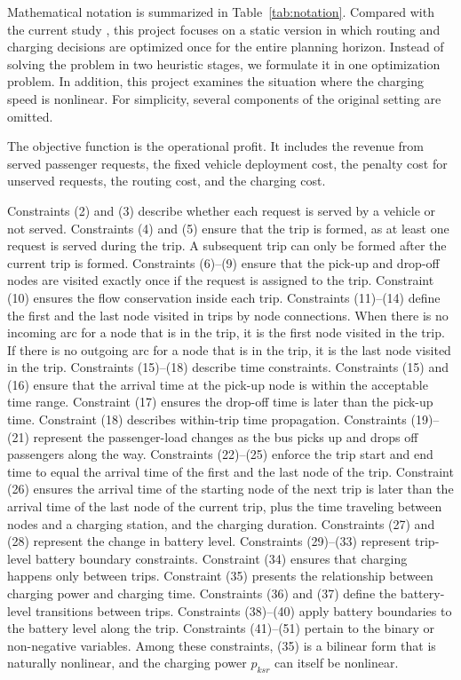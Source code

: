 \documentclass[11pt]{article}
\begin{document}
Mathematical notation is summarized in Table~\ref{tab:notation}. Compared with the current study \cite{jiang2026two}, this project focuses on a static version in which routing and charging decisions are optimized once for the entire planning horizon. Instead of solving the problem in two heuristic stages, we formulate it in one optimization problem. In addition, this project examines the situation where the charging speed is nonlinear. For simplicity, several components of the original setting are omitted.

The objective function is the operational profit. It includes the revenue from served passenger requests, the fixed vehicle deployment cost, the penalty cost for unserved requests, the routing cost, and the charging cost.

Constraints (2) and (3) describe whether each request is served by a vehicle or not served. Constraints (4) and (5) ensure that the trip is formed, as at least one request is served during the trip. A subsequent trip can only be formed after the current trip is formed. Constraints (6)--(9) ensure that the pick-up and drop-off nodes are visited exactly once if the request is assigned to the trip. Constraint (10) ensures the flow conservation inside each trip. Constraints (11)--(14) define the first and the last node visited in trips by node connections. When there is no incoming arc for a node that is in the trip, it is the first node visited in the trip. If there is no outgoing arc for a node that is in the trip, it is the last node visited in the trip. Constraints (15)--(18) describe time constraints. Constraints (15) and (16) ensure that the arrival time at the pick-up node is within the acceptable time range. Constraint (17) ensures the drop-off time is later than the pick-up time. Constraint (18) describes within-trip time propagation. Constraints (19)--(21) represent the passenger-load changes as the bus picks up and drops off passengers along the way. Constraints (22)--(25) enforce the trip start and end time to equal the arrival time of the first and the last node of the trip. Constraint (26) ensures the arrival time of the starting node of the next trip is later than the arrival time of the last node of the current trip, plus the time traveling between nodes and a charging station, and the charging duration. Constraints (27) and (28) represent the change in battery level. Constraints (29)--(33) represent trip-level battery boundary constraints. Constraint (34) ensures that charging happens only between trips. Constraint (35) presents the relationship between charging power and charging time. Constraints (36) and (37) define the battery-level transitions between trips. Constraints (38)--(40) apply battery boundaries to the battery level along the trip. Constraints (41)--(51) pertain to the binary or non-negative variables. Among these constraints, (35) is a bilinear form that is naturally nonlinear, and the charging power \(p_{ksr}\) can itself be nonlinear.
\end{document}
